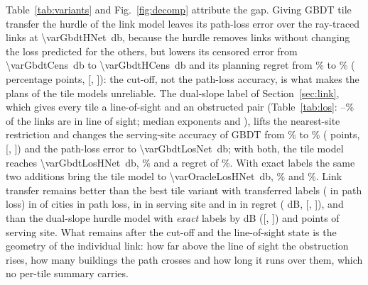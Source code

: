 Table~\ref{tab:variants} and Fig.~\ref{fig:decomp} attribute the gap.
Giving GBDT tile transfer the hurdle of the link model leaves its
path-loss error over the ray-traced links at \SI{\varGbdtHNet}{\decibel},
because the hurdle removes links without changing the loss predicted for
the others, but lowers its censored error from
\SI{\varGbdtCens}{\decibel} to \SI{\varGbdtHCens}{\decibel} and its planning
regret from \varGbdtRegret\% to \varGbdtHRegret\% (\dDecHurdleRegret{}
percentage points, [\loDecHurdleRegret, \hiDecHurdleRegret]): the cut-off,
not the path-loss accuracy, is what makes the plans of the tile models
unreliable. The dual-slope label of Section~\ref{sec:link}, which gives every
tile a line-of-sight and an obstructed pair (Table~\ref{tab:los}:
\losShareMin--\losShareMax\% of the links are in line of sight; median
exponents \losGammaMedian{} and \nlosGammaMedian), lifts the nearest-site
restriction and changes the serving-site accuracy of GBDT from
\varGbdtAssoc\% to \varGbdtLosAssoc\% (\dDecLosAssoc{} points,
[\loDecLosAssoc, \hiDecLosAssoc]) and the path-loss error to
\SI{\varGbdtLosNet}{\decibel}; with both, the tile model reaches
\SI{\varGbdtLosHNet}{\decibel}, \varGbdtLosHAssoc\% and a regret of
\varGbdtLosHRegret\%. With exact labels the same two additions bring the
tile model to \SI{\varOracleLosHNet}{\decibel}, \varOracleLosHAssoc\% and
\varOracleLosHRegret\%. Link transfer remains better than the best tile
variant with transferred labels (\varBestTileNetProse{} in path loss) in
\nLinkBetterTileNet{} of \nVarFolds{} cities in path loss, in
\nLinkBetterTileAssoc{} in serving site and in \nLinkBetterTileRegret{} in
regret (\dDecLinkBestTile{} dB, [\loDecLinkBestTile, \hiDecLinkBestTile]),
and than the dual-slope hurdle model with \emph{exact} labels by
\dDecLinkOracleLosH{} dB ([\loDecLinkOracleLosH, \hiDecLinkOracleLosH]) and
\dDecLinkOracleLosHAssoc{} points of serving site. What remains after the
cut-off and the line-of-sight state is the geometry of the individual link:
how far above the line of sight the obstruction rises, how many buildings
the path crosses and how long it runs over them, which no per-tile summary
carries.

